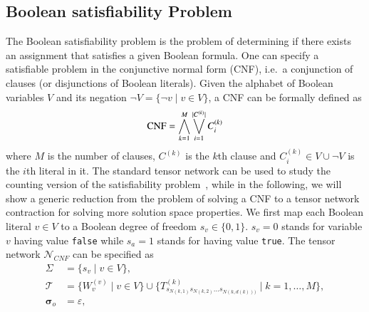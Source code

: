 \documentclass[review, onefignum, onetabnum]{siamart190516}
\begin{document}
\subsection{Boolean satisfiability Problem}
The Boolean satisfiability problem is the problem of determining if there exists an assignment that satisfies a given Boolean formula.
One can specify a satisfiable problem in the conjunctive normal form (CNF), i.e.\ a conjunction of clauses (or disjunctions of Boolean literals).
Given the alphabet of Boolean variables $V$ and its negation $\neg V = \{\neg v \mid v \in V\}$, a CNF can be formally defined as
\begin{equation}
    {\rm CNF} = \bigwedge_{k=1}^{M} \bigvee_{i=1}^{|C^{(k)}|} C^{(k)}_i
\end{equation}
where $M$ is the number of clauses, $C^{(k)}$ is the $k$th clause and $C^{(k)}_i \in V \cup \neg V$ is the $i$th literal in it.
The standard tensor network can be used to study the counting version of the satisfiability problem~\cite{Biamonte2015}, while in the following, we will show a generic reduction from the problem of solving a CNF to a tensor network contraction for solving more solution space properties.
We first map each Boolean literal $v\in V$ to a Boolean degree of freedom $s_v \in \{0, 1\}$.
$s_v = 0$ stands for variable $v$ having value \texttt{false} while $s_a=1$ stands for having value \texttt{true}.
The tensor network $\mathcal{N}_{CNF}$ can be specified as
\begin{equation}\label{eq:sattensornetwork}
\begin{split}
    \Sigma &= \{s_v \mid v \in V\},\\
    \mathcal{T} &= \{W^{(v)}_v \mid v \in V\} \cup \{T^{(k)}_{s_{N(k,1)} s_{N(k, 2)}\ldots s_{N(k,d(k)))}} \mid k=1,\ldots,M\},\\
    \boldsymbol{\sigma}_o &= \varepsilon,\\
\end{split}
\end{equation}
\end{document}
